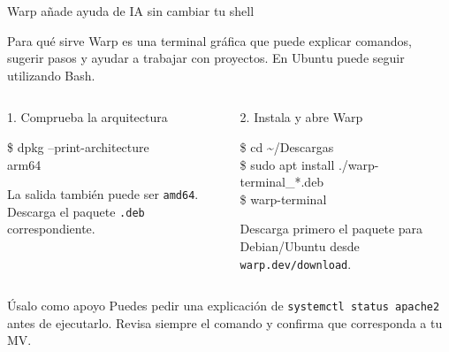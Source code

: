 \documentclass[aspectratio=169,10pt,c]{beamer}
\begin{document}
\begin{frame}{Warp añade ayuda de IA sin cambiar tu shell}
\begin{block}{Para qué sirve}
\small Warp es una terminal gráfica que puede explicar comandos, sugerir pasos y ayudar a trabajar con proyectos. En Ubuntu puede seguir utilizando Bash.
\end{block}
\begin{columns}[T,onlytextwidth]
\begin{exampleblock}{1. Comprueba la arquitectura}
\begin{terminal}
\$ dpkg --print-architecture\\
arm64
\end{terminal}
\small La salida también puede ser \texttt{amd64}. Descarga el paquete \texttt{.deb} correspondiente.
\end{exampleblock}
\begin{exampleblock}{2. Instala y abre Warp}
\begin{terminal}\footnotesize
\$ cd \textasciitilde/Descargas\\
\$ sudo apt install ./warp-terminal\_*.deb\\
\$ warp-terminal
\end{terminal}
\small Descarga primero el paquete para Debian/Ubuntu desde \texttt{warp.dev/download}.
\end{exampleblock}
\end{columns}
\begin{alertblock}{Úsalo como apoyo}
\small Puedes pedir una explicación de \texttt{systemctl status apache2} antes de ejecutarlo. Revisa siempre el comando y confirma que corresponda a tu MV.
\end{alertblock}
\end{frame}
\end{document}
